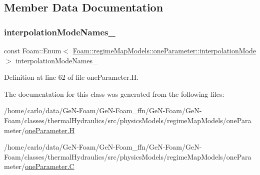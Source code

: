 \subsection{Member Data Documentation}
\mbox{\label{classFoam_1_1regimeMapModels_1_1oneParameter_a4a3e0fcb79dec9c0ad6f3f91bafbfd33}} 
\subsubsection{\texorpdfstring{interpolation\+Mode\+Names\+\_\+}{interpolationModeNames\_}}
{\footnotesize\ttfamily const Foam\+::\+Enum$<$ \hyperlink{classFoam_1_1regimeMapModels_1_1oneParameter_afe565d09517c0dde1ad7c89017837d93}{Foam\+::regime\+Map\+Models\+::one\+Parameter\+::interpolation\+Mode} $>$ interpolation\+Mode\+Names\+\_\+\hspace{0.3cm}{\ttfamily [static]}}



Definition at line 62 of file one\+Parameter.\+H.



The documentation for this class was generated from the following files\+:\begin{DoxyCompactItemize}
\item 
/home/carlo/data/\+Ge\+N-\/\+Foam/\+Ge\+N-\/\+Foam\+\_\+ffn/\+Ge\+N-\/\+Foam/\+Ge\+N-\/\+Foam/classes/thermal\+Hydraulics/src/physics\+Models/regime\+Map\+Models/one\+Parameter/\hyperlink{oneParameter_8H}{one\+Parameter.\+H}\item 
/home/carlo/data/\+Ge\+N-\/\+Foam/\+Ge\+N-\/\+Foam\+\_\+ffn/\+Ge\+N-\/\+Foam/\+Ge\+N-\/\+Foam/classes/thermal\+Hydraulics/src/physics\+Models/regime\+Map\+Models/one\+Parameter/\hyperlink{oneParameter_8C}{one\+Parameter.\+C}\end{DoxyCompactItemize}
